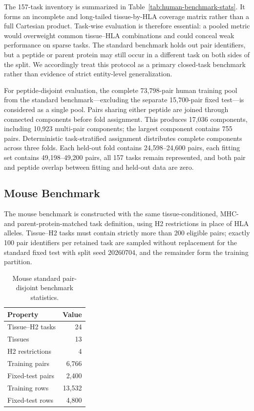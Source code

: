 The 157-task inventory is summarized in Table~\ref{tab:human-benchmark-stats}. It forms an incomplete and long-tailed tissue-by-HLA coverage matrix rather than a full Cartesian product. Task-wise evaluation is therefore essential: a pooled metric would overweight common tissue--HLA combinations and could conceal weak performance on sparse tasks. The standard benchmark holds out pair identifiers, but a peptide or parent protein may still occur in a different task on both sides of the split. We accordingly treat this protocol as a primary closed-task benchmark rather than evidence of strict entity-level generalization.

For peptide-disjoint evaluation, the complete 73,798-pair human training pool from the standard benchmark---excluding the separate 15,700-pair fixed test---is considered as a single pool. Pairs sharing either peptide are joined through connected components before fold assignment. This produces 17,036 components, including 10,923 multi-pair components; the largest component contains 755 pairs. Deterministic task-stratified assignment distributes complete components across three folds. Each held-out fold contains 24,598--24,600 pairs, each fitting set contains 49,198--49,200 pairs, all 157 tasks remain represented, and both pair and peptide overlap between fitting and held-out data are zero.

\subsection{Mouse Benchmark}

The mouse benchmark is constructed with the same tissue-conditioned, MHC- and parent-protein-matched task definition, using H2 restrictions in place of HLA alleles. Tissue--H2 tasks must contain strictly more than 200 eligible pairs; exactly 100 pair identifiers per retained task are sampled without replacement for the standard fixed test with split seed 20260704, and the remainder form the training partition.

\begin{table}[tbp]
\centering
\caption{Mouse standard pair-disjoint benchmark statistics.}
\label{tab:mouse-benchmark-stats}
\small
\begin{tabular}{lr}
\toprule
Property & Value \\
\midrule
Tissue--H2 tasks & 24 \\
Tissues & 13 \\
H2 restrictions & 4 \\
Training pairs & 6,766 \\
Fixed-test pairs & 2,400 \\
Training rows & 13,532 \\
Fixed-test rows & 4,800 \\
\bottomrule
\end{tabular}
\end{table}

